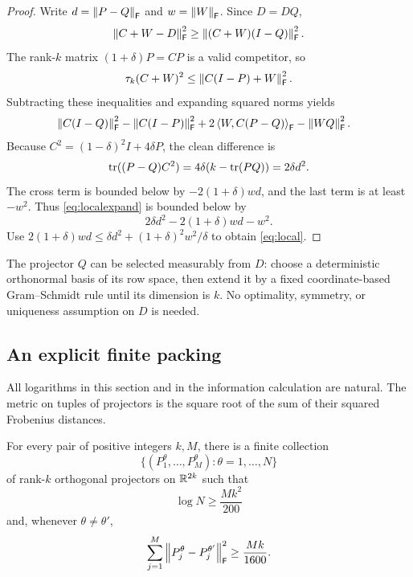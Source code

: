 \begin{proof}
Write $d=\left\lVert P-Q\right\rVert_{\mathsf F}$ and $w=\left\lVert W\right\rVert_{\mathsf F}$. Since $D=DQ$,
\[
 \left\lVert C+W-D\right\rVert_{\mathsf F}^2\ge\left\lVert (C+W)(I-Q)\right\rVert_{\mathsf F}^2.
\]
The rank-$k$ matrix $(1+\delta)P=CP$ is a valid competitor, so
\[
 \tau_k(C+W)^2\le\left\lVert C(I-P)+W\right\rVert_{\mathsf F}^2.
\]
Subtracting these inequalities and expanding squared norms yields
\begin{align}\label{eq:localexpand}
 &\left\lVert C(I-Q)\right\rVert_{\mathsf F}^2-\left\lVert C(I-P)\right\rVert_{\mathsf F}^2
  +2\left\langle W,C(P-Q)\right\rangle_{\mathsf F}-\left\lVert WQ\right\rVert_{\mathsf F}^2.
\end{align}
Because $C^2=(1-\delta)^2I+4\delta P$, the clean difference is
\[
 \operatorname{tr}((P-Q)C^2)=4\delta(k-\operatorname{tr}(PQ))=2\delta d^2.
\]
The cross term is bounded below by $-2(1+\delta)wd$, and the last term is at
least $-w^2$. Thus \eqref{eq:localexpand} is bounded below by
\[
 2\delta d^2-2(1+\delta)wd-w^2.
\]
Use
$2(1+\delta)wd\le\delta d^2+(1+\delta)^2w^2/\delta$
to obtain \eqref{eq:local}.
\end{proof}

The projector $Q$ can be selected measurably from $D$: choose a deterministic
orthonormal basis of its row space, then extend it by a fixed coordinate-based
Gram--Schmidt rule until its dimension is $k$. No optimality, symmetry, or
uniqueness assumption on $D$ is needed.

\subsection{An explicit finite packing}

All logarithms in this section and in the information calculation are natural.
The metric on tuples of projectors is the square root of the sum of their
squared Frobenius distances.

\begin{lemma}\label{lem:packing}
For every pair of positive integers $k,M$, there is a finite collection
\[
 \bigl\{(P_1^\theta,\ldots,P_M^\theta):\theta=1,\ldots,N\bigr\}
\]
of rank-$k$ orthogonal projectors on $\mathbb R^{2k}$ such that
\begin{equation}\label{eq:packsize}
 \log N\ge\frac{Mk^2}{200}
\end{equation}
and, whenever $\theta\ne\theta'$,
\begin{equation}\label{eq:packdist}
 \sum_{j=1}^M\left\lVert P_j^\theta-P_j^{\theta'}\right\rVert_{\mathsf F}^2
 \ge\frac{Mk}{1600}.
\end{equation}
\end{lemma}

